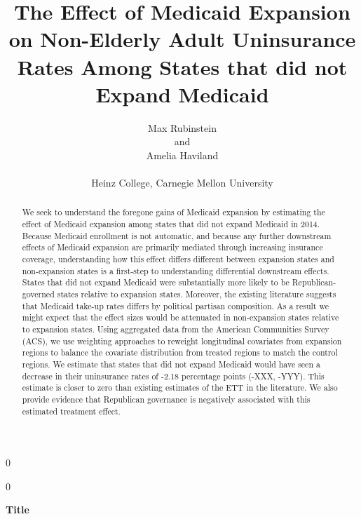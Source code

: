 \documentclass[12pt]{article}
\newcommand{\blind}{0}
\begin{document}


\def\spacingset#1{\renewcommand{\baselinestretch}%
{#1}\small\normalsize} \spacingset{1}


\blind
{
  \title{\bf The Effect of Medicaid Expansion on Non-Elderly Adult Uninsurance Rates Among States that did not Expand Medicaid}
  \author{Max Rubinstein \hspace{.2cm}\\
    and \\
    Amelia Haviland \\ \\
    Heinz College, Carnegie Mellon University}
  \maketitle
} \fi

\blind
{
  \bigskip
  \bigskip
  \bigskip
  \begin{center}
    {\LARGE\bf Title}
\end{center}
  \medskip
} \fi

\bigskip
\begin{abstract}
We seek to understand the foregone gains of Medicaid expansion by estimating the effect of Medicaid expansion among states that did not expand Medicaid in 2014. Because Medicaid enrollment is not automatic, and because any further downstream effects of Medicaid expansion are primarily mediated through increasing insurance coverage, understanding how this effect differs different between expansion states and non-expansion states is a first-step to understanding differential downstream effects. States that did not expand Medicaid were substantially more likely to be Republican-governed states relative to expansion states. Moreover, the existing literature suggests that Medicaid take-up rates differs by political partisan composition. As a result we might expect that the effect sizes would be attenuated in non-expansion states relative to expansion states. Using aggregated data from the American Communities Survey (ACS), we use weighting approaches to reweight longitudinal covariates from expansion regions to balance the covariate distribution from treated regions to match the control regions. We estimate that states that did not expand Medicaid would have seen a decrease in their uninsurance rates of -2.18 percentage points (-XXX, -YYY). This estimate is closer to zero than existing estimates of the ETT in the literature. We also provide evidence that Republican governance is negatively associated with this estimated treatment effect. 
\end{abstract}
\end{document}
